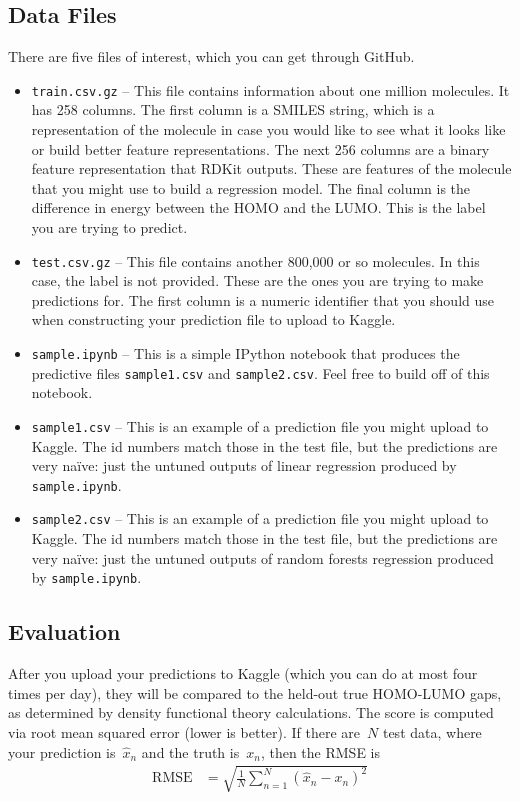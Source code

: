 \documentclass[12pt]{article}
\begin{document}
	\subsection*{Data Files}
	There are five files of interest, which you can get through GitHub.
	\begin{itemize}
		\item \verb|train.csv.gz| -- This file contains information about one million molecules.  It has 258 columns.  The first column is a SMILES string, which is a representation of the molecule in case you would like to see what it looks like or build better feature representations. The next 256 columns are a binary feature representation that RDKit outputs.  These are features of the molecule that you might use to build a regression model.  The final column is the difference in energy between the HOMO and the LUMO.  This is the label you are trying to predict.
		\item \verb|test.csv.gz| -- This file contains another 800,000 or so molecules.  In this case, the label is not provided.  These are the ones you are trying to make predictions for. The first column is a numeric identifier that you should use when constructing your prediction file to upload to Kaggle.
		\item \verb|sample.ipynb| -- This is a simple IPython notebook that produces the predictive files \verb|sample1.csv| and \verb|sample2.csv|.  Feel free to build off of this notebook.
		\item \verb|sample1.csv| -- This is an example of a prediction file you might upload to Kaggle.  The id numbers match those in the test file, but the predictions are very na\"ive: just the untuned outputs of linear regression produced by \verb|sample.ipynb|.
		\item \verb|sample2.csv| -- This is an example of a prediction file you might upload to Kaggle.  The id numbers match those in the test file, but the predictions are very na\"ive: just the untuned outputs of random forests regression produced by \verb|sample.ipynb|.
	\end{itemize}
	
	\subsection*{Evaluation}
	After you upload your predictions to Kaggle (which you can do at most four times per day), they will be compared to the held-out true HOMO-LUMO gaps, as determined by density functional theory calculations.  The score is computed via root mean squared error (lower is better).  If there are~$N$ test data, where your prediction is~$\hat{x}_n$ and the truth is~$x_n$, then the RMSE is 
	\begin{align*}
		\text{RMSE} &= \sqrt{\frac{1}{N}\sum_{n=1}^N (\hat{x}_n-x_n)^2}
	\end{align*}
	
\end{document}
